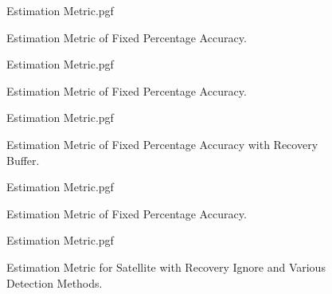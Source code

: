 \documentclass[letterpaper, 10 pt, conference]{ieeeconf}  %
\begin{document}
	\begin{figure}[!htb]
		\begin{center}
			{Estimation Metric.pgf}
		\end{center}
		\caption[Estimation Metric of $90.0\%$ Accuracy]{Estimation Metric of Fixed Percentage Accuracy.}
		\label{fig:Estimation Accuracy EKF-ignore 90}
	\end{figure}
	
	\begin{figure}[!htb]
		\begin{center}
			{Estimation Metric.pgf}
		\end{center}
		\caption[Estimation Metric of $90.0\%$ Accuracy]{Estimation Metric of Fixed Percentage Accuracy.}
		\label{fig:Estimation Accuracy EKF-ignore 90 perfectnofailureprediction}
	\end{figure}
	
	\begin{figure}[!htb]
		\begin{center}
			{Estimation Metric.pgf}
		\end{center}
		\caption[Estimation Metric of $90.0\%$ Accuracy with Recovery Buffer]{Estimation Metric of Fixed Percentage Accuracy with Recovery Buffer.}
		\label{fig:Estimation Accuracy EKF-ignore 90 with Recovery Buffer}
	\end{figure}
	
	\begin{figure}[!htb]
		\begin{center}
			{Estimation Metric.pgf}
		\end{center}
		\caption[Estimation Metric of $90.0\%$ Accuracy]{Estimation Metric of Fixed Percentage Accuracy.}
		\label{fig:Estimation Accuracy EKF-ignore 90 perfectnofailureprediction with Recovery Buffer}
	\end{figure}

	
	\begin{figure}[!htb]
		\begin{center}
			{Estimation Metric.pgf}
		\end{center}
		\caption[Estimation Metric for Satellite with Recovery Ignore and Various detection Methods]{Estimation Metric for Satellite with Recovery Ignore and Various Detection Methods.}
		\label{fig:Estimation Accuracy EKF-top2 summary}
	\end{figure}
	
\end{document}
